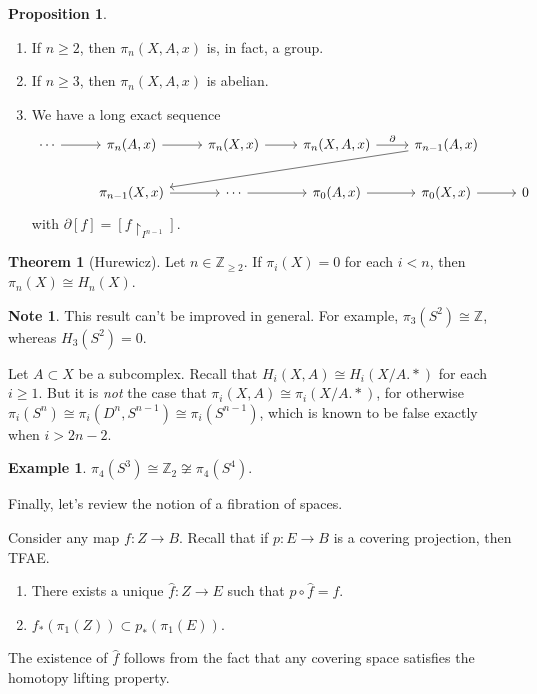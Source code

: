 \documentclass[10pt,letterpaper,cm]{nupset}
\theoremstyle{definition}
\newtheorem{exmp}[defn]{Example}
\newtheorem{note}[defn]{Note}
\theoremstyle{theorem}
\newtheorem{theorem}[defn]{Theorem}
\newtheorem{prop}[defn]{Proposition}
\theoremstyle{remark}
\newcommand{\Z}{\mathbb Z}
\newcommand{\1}{\mathbb{1}}
\newcommand{\0}{\vec 0}
\newcommand{\be}{\begin{enumerate}}
\newcommand{\ee}{\end{enumerate}}
\begin{document}
\begin{prop} $ $
\be
\item If $n\geq 2$, then $\pi_n(X, A, x)$ is, in fact, a group.
\item If $n\geq 3$, then $\pi_n(X, A, x)$ is abelian.
\item We have a long exact sequence 
\[
\begin{tikzcd}
\cdots \arrow[r] & {\pi_n(A,x)} \arrow[r]     & {\pi_n(X, x)} \arrow[r] & {\pi_n(X, A, x)} \arrow[r, "\partial"] & {\pi_{n-1}(A,x)} \arrow[llld] &   \\
                 & {\pi_{n-1}(X,x)} \arrow[r] & \cdots \arrow[r]        & {\pi_0(A, x)} \arrow[r]                & {\pi_0(X,x)} \arrow[r]        & 0
\end{tikzcd}
\] with $\partial{[f]} = \left[f\restriction_{I^{n-1}}\right]$.
\ee 
\end{prop}

\begin{theorem}[Hurewicz] 
Let $n\in \Z_{\geq 2}$. If $\pi_i(X) =0$ for each $i < n$, then $\pi_n(X) \cong H_n(X)$. 
\end{theorem}

\begin{note}
This result can't be improved in general. For example, $\pi_3(S^2) \cong \Z$, whereas $H_3(S^2) =0$.
\end{note}

Let $A \subset X$ be a subcomplex. Recall that $H_i(X, A) \cong H_i(X/A. \ast)$ for each $i\geq 1$. But it is \emph{not} the case that $\pi_i(X, A) \cong \pi_i(X/A. \ast)$, for otherwise  $\pi_i(S^n) \cong \pi_i(D^n, S^{n-1}) \cong \pi_i(S^{n-1})$, which is known to be false exactly when $i > 2n-2$. 

\begin{exmp}
$\pi_4(S^3) \cong \Z_2 \not \cong  \pi_4(S^4)$.
\end{exmp}

\bigskip

Finally, let's review the notion of a fibration of spaces.

\medskip

Consider any map $f: Z \to B$. Recall that if $p: E \to B$ is a covering projection, then TFAE.
\be
\item There exists a unique $\hat{f} : Z \to E$ such that $p \circ \hat{f} = f$.
\item $f_{\ast}(\pi_1(Z)) \subset p_{\ast}(\pi_1(E))$.
\ee

The existence of $\hat{f}$ follows from the fact that any covering space satisfies the homotopy lifting property.
\end{document}
